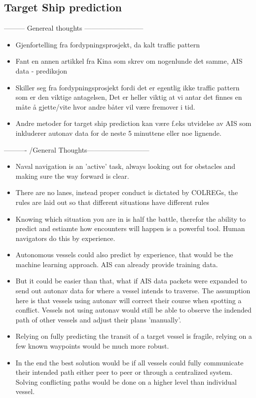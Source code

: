\subsection{Target Ship prediction}
--------- Genereal thoughts --------------------------
\begin{itemize}
    \item Gjenfortelling fra fordypningsprosjekt, da kalt traffic pattern
    \item Fant en annen artikkel fra Kina som skrev om nogenlunde det samme, \gls{AIS} data -\> prediksjon
    \item Skiller seg fra fordypningsprosjekt fordi det er egentlig ikke traffic pattern som er den viktige antagelsen,
    Det er heller viktig at vi antar det finnes en måte å gjette/vite hvor andre båter vil være fremover i tid.
    \item Andre metoder for target ship prediction kan være f.eks utvidelse av \gls{AIS} som 
    inkluderer autonav data for de neste 5 minuttene eller noe lignende.
\end{itemize}
---------- /General Thoughts--------------------------- 
\begin{itemize}
    \item Naval navigation is an 'active' task, always looking out for obstacles and making sure the way forward is clear.
    \item There are no lanes, instead proper conduct is dictated by \gls{COLREGs}, the rules are laid out so that different situations
    have different rules
    \item Knowing which situation you are in is half the battle, therefor the ability to predict and estiamte how encounters will happen
    is a powerful tool. Human navigators do this by experience.
    \item Autonomous vessels could also predict by experience, that would be the machine learning approach. \gls{AIS} can already provide training data.
    \item But it could be easier than that, what if \gls{AIS} data packets were expanded to send out autonav data for where a vessel intends to traverse.
    The assumption here is that vessels using autonav will correct their course when spotting a conflict. Vessels not using autonav would still be able to observe
    the indended path of other vessels and adjust their plans 'manually'.
    \item Relying on fully predicting the transit of a target vessel is fragile, relying on a few known waypoints would be much more robust.
    \item In the end the best solution would be if all vessels could fully communicate their intended path either peer to peer or through
    a centralized system. Solving conflicting paths would be done on a higher level than individual vessel.
\end{itemize}


